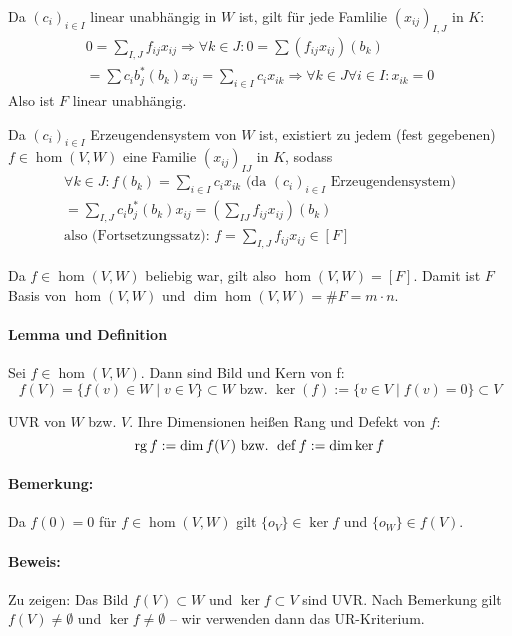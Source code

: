 	Da $(c_i)_{i\in I}$ linear unabhängig in $W$ ist, gilt für jede Famlilie $(x_{ij})_{I,J}$ in $K$:
		\begin{gather*}
			0 = \sum_{I,J} f_{ij}x_{ij} \Rightarrow \forall k \in J: 0 = \sum (f_{ij}x_{ij})(b_k)\\
			= \sum c_i b_j^* (b_k) x_{ij} = \sum_{i\in I} c_ix_{ik} \Rightarrow \forall k\in J\forall i\in I:x_{ik} = 0
		\end{gather*}
	Also ist $F$ linear unabhängig.
	
	Da $(c_i)_{i\in I}$ Erzeugendensystem von $W$ ist, existiert zu jedem (fest gegebenen) $f\in\hom (V,W)$ eine Familie $(x_{ij})_{IJ}$ in $K$, sodass
		\begin{gather*}
		\forall k\in J: f(b_k) = \sum_{i\in I} c_i x_{ik} \text{ (da $(c_i)_{i\in I}$ Erzeugendensystem)}\\
		= \sum_{I,J}c_ib_j^*(b_k)x_{ij} = \left(\sum_{IJ} f_{ij}x_{ij}\right)(b_k)\\
		\text{also (Fortsetzungssatz): } f=\sum_{I,J}f_{ij}x_{ij} \in [F]
		\end{gather*}
	
	Da $f\in\hom (V,W)$ beliebig war, gilt also $\hom (V,W) = [F]$. Damit ist $F$ Basis von $\hom (V,W)$ und $\dim\hom (V,W) = \# F = m\cdot n$.
	
\paragraph{Lemma und Definition}
	Sei $f\in \hom (V,W)$. Dann sind Bild und Kern von f:
		\begin{equation*}
			f(V) = \{f(v)\in W\mid v\in V \}\subset W \text{ bzw. } \ker (f) := \{v\in V\mid f(v) = 0 \} \subset V
		\end{equation*}
	
	UVR von $W$ bzw. $V$. Ihre Dimensionen heißen Rang und Defekt von $f$:
		\begin{equation*}
			\operatorname{rg} f := \dim f(V) \text{ bzw. } \operatorname{def} f := \dim \ker f
		\end{equation*}

\paragraph{Bemerkung: }
	Da $f(0)=0$ für  $f\in \hom (V,W)$ gilt $\{o_V \}\in \ker f$ und $\{o_W \}\in f(V)$.

\paragraph{Beweis: }
	Zu zeigen: Das Bild $f(V)\subset W$ und $\ker f\subset V$ sind UVR. Nach Bemerkung gilt $f(V)\neq \emptyset$ und $\ker f \neq \emptyset$ -- wir verwenden dann das UR-Kriterium.
	
